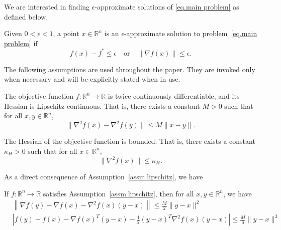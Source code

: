 \documentclass{mcom-l}
\numberwithin{equation}{section}
\begin{document}
We are interested in finding $\epsilon$-approximate solutions of \eqref{eq.main problem} as defined below.
\begin{definition}
    \label{def.approximate solution}
    Given $0<\epsilon <1$, a point $x \in \mathbb{R}^n$ is an $\epsilon$-approximate solution to problem~\eqref{eq.main problem} if
    \begin{equation}
        \label{eq.approximate solution}
        f(x) - f^* \leq \epsilon \quad \text{or} \quad \|\nabla f(x)\| \leq \epsilon.
    \end{equation}
\end{definition}
The following assumptions are used throughout the paper. They are invoked only when necessary and will be explicitly stated when in use.
\begin{assumption}
    \label{assm.lipschitz}
    The objective function $f: \mathbb{R}^n \to \mathbb{R}$ is twice continuously differentiable, and its Hessian is Lipschitz continuous. That is, there exists a constant $M > 0$ such that for all $x, y \in \mathbb{R}^n$,
    \begin{equation}
        \label{eq.main assm}
        \|\nabla^2 f(x) - \nabla^2 f(y)\| \leq M \|x - y\|. \end{equation}
\end{assumption}
\begin{assumption}
    \label{assm.bounded hessian}
    The Hessian of the objective function is bounded. That is, there exists a constant $\kappa_H > 0$ such that for all $x \in \mathbb{R}^n$, \begin{equation}
        \label{eq.bounded hessian}
        \|\nabla^2 f(x)\| \leq \kappa_H.
    \end{equation} \end{assumption}
As a direct consequence of Assumption~\ref{assm.lipschitz}, we have
\begin{lemma}\label{lem.lipschitz}
    If \(f:\mathbb{R}^n \mapsto \mathbb{R}\) satisfies Assumption~\ref{assm.lipschitz}, then for all \(x,y\in \mathbb{R}^n\), we have
    \begin{subequations}
        \begin{align}
            \label{eq.first-order exp}
             & \left\|\nabla f(y)-\nabla f(x)-\nabla^{2} f(x)(y-x)\right\|                       \leq \frac{M}{2}\|y-x\|^{2} \\
            \label{eq.second-order exp}
             & \left|f(y)-f(x)-\nabla f(x)^T(y-x)-\frac{1}{2}(y-x)^T\nabla^{2} f(x)(y-x)\right|  \leq \frac{M}{6}\|y-x\|^{3}
        \end{align}
    \end{subequations}
\end{lemma}
\end{document}
